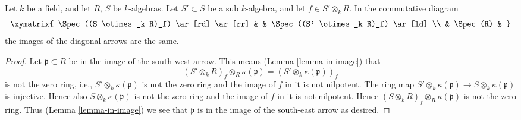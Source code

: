 \begin{lemma}
\label{lemma-same-image}
Let $k$ be a field, and let $R$, $S$ be $k$-algebras.
Let $S' \subset S$ be a sub $k$-algebra, and let $f \in S' \otimes_k R$.
In the commutative diagram
$$
\xymatrix{
\Spec((S \otimes_k R)_f) \ar[rd] \ar[rr] & &
\Spec((S' \otimes_k R)_f) \ar[ld] \\
& \Spec(R) &
}
$$
the images of the diagonal arrows are the same.
\end{lemma}

\begin{proof}
Let $\mathfrak p \subset R$ be in the image of the south-west
arrow. This means (Lemma \ref{lemma-in-image}) that
$$
(S' \otimes_k R)_f \otimes_R \kappa(\mathfrak p)
=
(S' \otimes_k \kappa(\mathfrak p))_f
$$
is not the zero ring, i.e., $S' \otimes_k \kappa(\mathfrak p)$
is not the zero ring and the image of $f$ in it is not nilpotent.
The ring map
$S' \otimes_k \kappa(\mathfrak p) \to S \otimes_k \kappa(\mathfrak p)$
is injective. Hence also $S \otimes_k \kappa(\mathfrak p)$
is not the zero ring and the image of $f$ in it is not nilpotent.
Hence $(S \otimes_k R)_f \otimes_R \kappa(\mathfrak p)$
is not the zero ring. Thus (Lemma \ref{lemma-in-image})
we see that $\mathfrak p$ is in the image of the south-east arrow
as desired.
\end{proof}